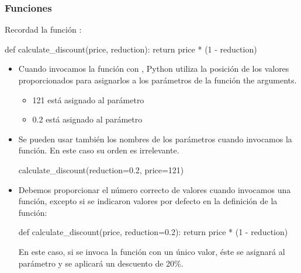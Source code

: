 \documentclass[handout,9pt]{beamer}
\begin{document}
\begin{frame}[fragile]
  \frametitle{Funciones}
  \begin{block}{Recordad la función :}
    \begin{pyverbatim}
def calculate_discount(price, reduction):
    return price * (1 - reduction)
  \end{pyverbatim}
  \end{block}
  \begin{itemize}
  \item<2->   Cuando invocamos la función con  ,
  Python utiliza la posición de los valores proporcionados para
  asignarlos a los parámetros de la función
  the arguments.
  \begin{itemize}
  \item 121 está asignado al parámetro 
  \item 0.2 está asignado al parámetro 
  \end{itemize}
\item<3-> Se pueden usar también los nombres de los
  parámetros cuando invocamos la función. En este caso su orden es irrelevante.
  \begin{pyverbatim}
calculate_discount(reduction=0.2, price=121) 
  \end{pyverbatim}
\item<4-> Debemos proporcionar el número correcto de valores cuando
  invocamos una función, excepto si se indicaron valores por defecto
  en la definición de la función:
  \begin{pyverbatim}
def calculate_discount(price, reduction=0.2):
    return price * (1 - reduction)
  \end{pyverbatim}
  En este caso, si se invoca la función con un único valor, éste se
  asignará al parámetro  y se aplicará un descuento de 20\%.
  \end{itemize}
\end{frame}
\end{document}
